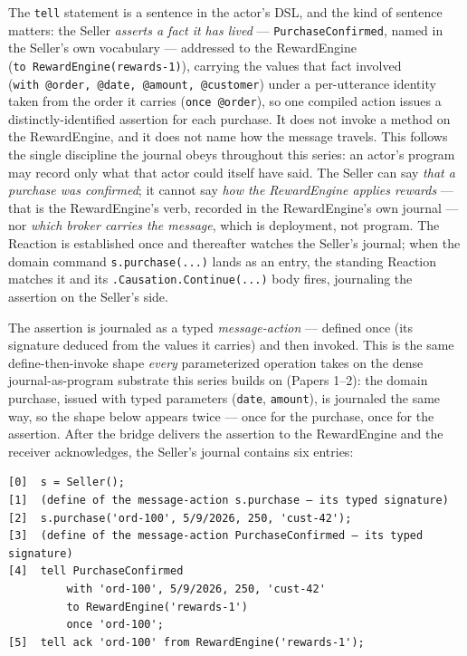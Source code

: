 \documentclass[
]{article}
\let\origtexttt\texttt%
\renewcommand{\texttt}[1]{\origtexttt{\seqsplit{#1}}}%
\let\texttt\origtexttt%
\begin{document}
The \texttt{tell} statement is a sentence in the actor's DSL, and the
kind of sentence matters: the Seller \emph{asserts a fact it has lived}
--- \texttt{PurchaseConfirmed}, named in the Seller's own vocabulary ---
addressed to the RewardEngine
(\texttt{to\ RewardEngine(\textquotesingle{}rewards-1\textquotesingle{})}),
carrying the values that fact involved
(\texttt{with\ @order,\ @date,\ @amount,\ @customer}) under a
per-utterance identity taken from the order it carries
(\texttt{once\ @order}), so one compiled action issues a
distinctly-identified assertion for each purchase. It does not invoke a
method on the RewardEngine, and it does not name how the message
travels. This follows the single discipline the journal obeys throughout
this series: an actor's program may record only what that actor could
itself have said. The Seller can say \emph{that a purchase was
confirmed}; it cannot say \emph{how the RewardEngine applies rewards}
--- that is the RewardEngine's verb, recorded in the RewardEngine's own
journal --- nor \emph{which broker carries the message}, which is
deployment, not program. The Reaction is established once and thereafter
watches the Seller's journal; when the domain command
\texttt{s.purchase(...)} lands as an entry, the standing Reaction
matches it and its \texttt{.Causation.Continue(...)} body fires,
journaling the assertion on the Seller's side.

The assertion is journaled as a typed \emph{message-action} --- defined
once (its signature deduced from the values it carries) and then
invoked. This is the same define-then-invoke shape \emph{every}
parameterized operation takes on the dense journal-as-program substrate
this series builds on (Papers 1--2): the domain purchase, issued with
typed parameters (\texttt{date}, \texttt{amount}), is journaled the same
way, so the shape below appears twice --- once for the purchase, once
for the assertion. After the bridge delivers the assertion to the
RewardEngine and the receiver acknowledges, the Seller's journal
contains six entries:

\begin{verbatim}
[0]  s = Seller();
[1]  (define of the message-action s.purchase — its typed signature)
[2]  s.purchase('ord-100', 5/9/2026, 250, 'cust-42');
[3]  (define of the message-action PurchaseConfirmed — its typed signature)
[4]  tell PurchaseConfirmed
         with 'ord-100', 5/9/2026, 250, 'cust-42'
         to RewardEngine('rewards-1')
         once 'ord-100';
[5]  tell ack 'ord-100' from RewardEngine('rewards-1');
\end{verbatim}
\end{document}
